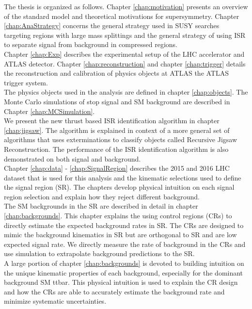 \indent The thesis is organized as follows.  Chapter \ref{chap:motivation} presents an overview of the standard model and theoretical motivations for supersymmetry. Chapter \ref{chap:AnaStrategy} concerns the general strategy used in SUSY searches targeting regions with large mass splittings and the general strategy of using ISR to separate signal from background in compressed regions.  \\

\indent Chapter \ref{chap:Exp} describes the experimental setup of the LHC accelerator and ATLAS detector.   Chapter \ref{chap:reconstruction} and chapter \ref{chap:trigger} details the reconstruction and calibration of physics objects at ATLAS the ATLAS trigger system.  \\

\indent The physics objects used in the analysis are defined in chapter \ref{chap:objects}.  The Monte Carlo simulations of stop signal and SM background are described in Chapter \ref{chap:MCSimulation}.  \\ 

\indent We present the new thrust based ISR identification algorithm in chapter \ref{chap:jigsaw}.  The algorithm is explained in context of a more general set of algorithms that uses exterminations to classify objects called Recursive Jigsaw Reconstruction.  The performance of the ISR identification algorithm is also demonstrated on both signal and background. \\

\indent Chapter \ref{chap:data} - \ref{chap:SignalRegion} describes the 2015 and 2016 LHC dataset that is used for this analysis and the kinematic selections used to define the signal region (SR).  The chapters develop physical intuition on each signal region selection and explain how they reject different background.  \\

\indent The SM backgrounds in the SR are described in detail in chapter \ref{chap:backgrounds}.  This chapter explains the using control regions (CRs) to directly estimate the expected background rates in SR.  The CRs are designed to mimic the background kinematics in SR but are orthogonal to SR and are low expected signal rate.  We directly measure the rate of background in the CRs and use simulation to extrapolate background predictions to the SR. \\

\indent  A large portion of chapter \ref{chap:backgrounds} is devoted to building intuition on the unique kinematic properties of each background, especially for the dominant background SM ttbar.  This physical intuition is used to explain the CR design and how the CRs are able to accurately estimate the background rate and minimize systematic uncertainties.  \\

